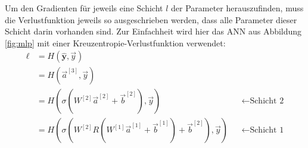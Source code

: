 \documentclass[12pt,titlepage]{article}
\begin{document}
Um den Gradienten für jeweils eine Schicht $l$ der Parameter herauszufinden, muss die Verlustfunktion jeweils so ausgeschrieben werden, dass alle Parameter dieser Schicht darin vorhanden sind. Zur Einfachheit wird hier das ANN aus Abbildung \ref{fig:mlp} mit einer Kreuzentropie-Verlustfunktion verwendet:
\[
  \begin{aligned}
    \ell
     & = H(\mathbf{\hat{y}}, \vec{y})                                                                                           \\
     & = H(\vec{a}^{[3]}, \vec{y})                                                                                              \\
     & = H(\sigma(W^{[2]} \vec{a}^{[2]} + \vec{b}^{[2]}), \vec{y})                            &  & \leftarrow \text{Schicht 2}  \\
     & = H(\sigma(W^{[2]} R(W^{[1]} \vec{a}^{[1]} + \vec{b}^{[1]}) + \vec{b}^{[2]}), \vec{y}) &  & \leftarrow  \text{Schicht 1} \\
  \end{aligned}
\]
\end{document}
